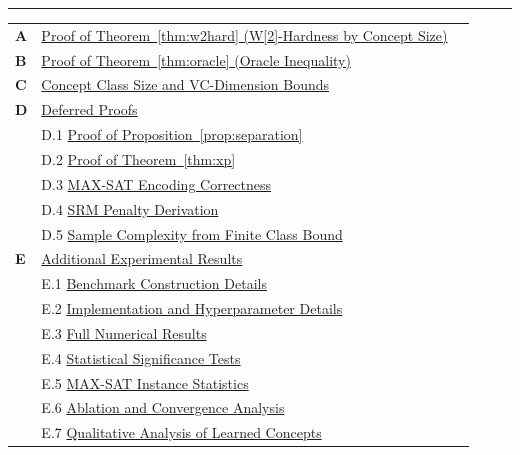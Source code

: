 \documentclass[accepted]{uai2026} %
\theoremstyle{definition}
\theoremstyle{remark}
\begin{document}
\vspace{1.2cm}

\noindent\rule{\textwidth}{0.8pt}

\vspace{0.6cm}

\renewcommand{\arraystretch}{1.6}
\noindent
\hfill
\begin{tabular}{@{}p{0.8cm}@{\;}p{11.8cm}r@{}}
  \textbf{A} & \hyperref[app:w2hard]{Proof of Theorem~\ref*{thm:w2hard} (W[2]-Hardness by Concept Size)} & \pageref{app:w2hard} \\

  \textbf{B} & \hyperref[app:oracle]{Proof of Theorem~\ref*{thm:oracle} (Oracle Inequality)} & \pageref{app:oracle} \\

  \textbf{C} & \hyperref[app:vc]{Concept Class Size and VC-Dimension Bounds} & \pageref{app:vc} \\

  \textbf{D} & \hyperref[app:proofs]{Deferred Proofs} & \pageref{app:proofs} \\
  & \quad\small D.1\;\; \hyperref[app:sep-proof]{Proof of Proposition~\ref*{prop:separation}} & \pageref{app:sep-proof} \\
  & \quad\small D.2\;\; \hyperref[app:xp-proof]{Proof of Theorem~\ref*{thm:xp}} & \pageref{app:xp-proof} \\
  & \quad\small D.3\;\; \hyperref[app:maxsat-correct]{MAX-SAT Encoding Correctness} & \pageref{app:maxsat-correct} \\
  & \quad\small D.4\;\; \hyperref[app:penalty]{SRM Penalty Derivation} & \pageref{app:penalty} \\
  & \quad\small D.5\;\; \hyperref[app:sample]{Sample Complexity from Finite Class Bound} & \pageref{app:sample} \\

  \textbf{E} & \hyperref[app:experiments]{Additional Experimental Results} & \pageref{app:experiments} \\
  & \quad\small E.1\;\; \hyperref[app:bench]{Benchmark Construction Details} & \pageref{app:bench} \\
  & \quad\small E.2\;\; \hyperref[app:implementation]{Implementation and Hyperparameter Details} & \pageref{app:implementation} \\
  & \quad\small E.3\;\; \hyperref[app:full-results]{Full Numerical Results} & \pageref{app:full-results} \\
  & \quad\small E.4\;\; \hyperref[app:significance]{Statistical Significance Tests} & \pageref{app:significance} \\
  & \quad\small E.5\;\; \hyperref[app:maxsat-stats]{MAX-SAT Instance Statistics} & \pageref{app:maxsat-stats} \\
  & \quad\small E.6\;\; \hyperref[app:ablation]{Ablation and Convergence Analysis} & \pageref{app:ablation} \\
  & \quad\small E.7\;\; \hyperref[app:qualitative]{Qualitative Analysis of Learned Concepts} & \pageref{app:qualitative} \\
\end{tabular}
\hfill\null
\renewcommand{\arraystretch}{1.0}
\end{document}
